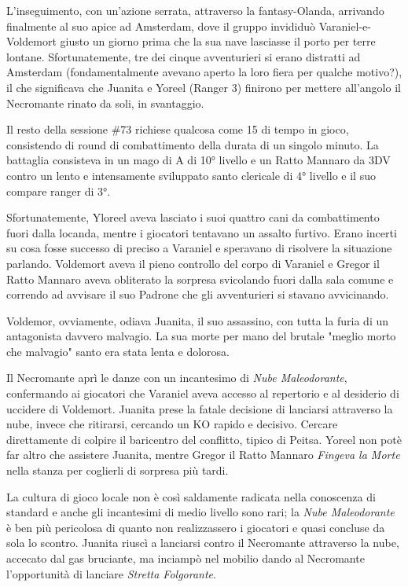 L'inseguimento, con un'azione serrata, attraverso la fantasy-Olanda, arrivando finalmente al suo apice ad Amsterdam, dove il gruppo invididuò Varaniel-e-Voldemort giusto un giorno prima che la sua nave lasciasse il porto per terre lontane. Sfortunatemente, tre dei cinque avventurieri si erano distratti ad Amsterdam (fondamentalmente avevano aperto la loro fiera per qualche motivo?), il che significava che Juanita e Yoreel (Ranger 3) finirono per mettere all'angolo il Necromante rinato da soli, in svantaggio.


Il resto della sessione \#73 richiese qualcosa come 15 di tempo in gioco, consistendo di round di combattimento della durata di un singolo minuto. La battaglia consisteva in un mago di A\dnd{} di 10° livello e un Ratto Mannaro da 3DV contro un lento e intensamente sviluppato santo clericale di 4° livello e il suo compare ranger di 3°.

Sfortunatemente, Yloreel aveva lasciato i suoi quattro cani da combattimento fuori dalla locanda, mentre i giocatori tentavano un assalto furtivo. Erano incerti su cosa fosse successo di preciso a Varaniel e speravano di risolvere la situazione parlando. Voldemort aveva il pieno controllo del corpo di Varaniel e Gregor il Ratto Mannaro aveva obliterato la sorpresa svicolando fuori dalla sala comune e correndo ad avvisare il suo Padrone che gli avventurieri si stavano avvicinando.

Voldemor, ovviamente, odiava Juanita, il suo assassino, con tutta la furia di un antagonista davvero malvagio. La sua morte per mano del brutale "meglio morto che malvagio" santo era stata lenta e dolorosa.

Il Necromante aprì le danze con un incantesimo di \textit{Nube Maleodorante}, confermando ai giocatori che Varaniel aveva accesso al repertorio e al desiderio di uccidere di Voldemort. Juanita prese la fatale decisione di lanciarsi attraverso la nube, invece che ritirarsi, cercando un KO rapido e decisivo. Cercare direttamente di colpire il baricentro del conflitto, tipico di Peitsa. Yoreel non potè far altro che assistere Juanita, mentre Gregor il Ratto Mannaro \textit{Fingeva la Morte} nella stanza per coglierli di sorpresa più tardi.

La cultura di gioco locale non è così saldamente radicata nella conoscenza di \dnd{} standard e anche gli incantesimi di medio livello sono rari; la \textit{Nube Maleodorante} è ben più pericolosa di quanto non realizzassero i giocatori e quasi concluse da sola lo scontro. Juanita riuscì a lanciarsi contro il Necromante attraverso la nube, accecato dal gas bruciante, ma inciampò nel mobilio dando al Necromante l'opportunità di lanciare \textit{Stretta Folgorante}.


